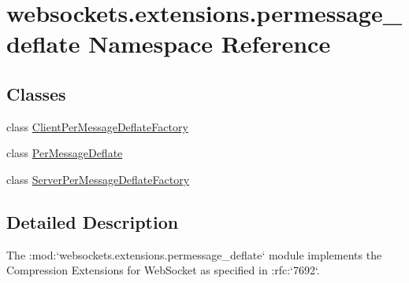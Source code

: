 \hypertarget{namespacewebsockets_1_1extensions_1_1permessage__deflate}{}\section{websockets.\+extensions.\+permessage\+\_\+deflate Namespace Reference}
\label{namespacewebsockets_1_1extensions_1_1permessage__deflate}
\subsection*{Classes}
\begin{DoxyCompactItemize}
\item 
class \hyperlink{classwebsockets_1_1extensions_1_1permessage__deflate_1_1_client_per_message_deflate_factory}{Client\+Per\+Message\+Deflate\+Factory}
\item 
class \hyperlink{classwebsockets_1_1extensions_1_1permessage__deflate_1_1_per_message_deflate}{Per\+Message\+Deflate}
\item 
class \hyperlink{classwebsockets_1_1extensions_1_1permessage__deflate_1_1_server_per_message_deflate_factory}{Server\+Per\+Message\+Deflate\+Factory}
\end{DoxyCompactItemize}


\subsection{Detailed Description}
\begin{DoxyVerb}The :mod:`websockets.extensions.permessage_deflate` module implements the
Compression Extensions for WebSocket as specified in :rfc:`7692`.\end{DoxyVerb}
 